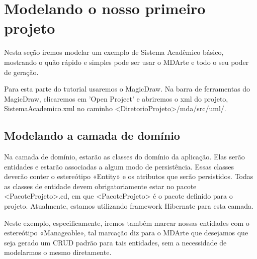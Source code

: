 \section{Modelando o nosso primeiro projeto}

Nesta seção iremos modelar um exemplo de Sistema Acadêmico básico, mostrando o
quão rápido e simples pode ser usar o MDArte e todo o seu poder de geração.

Para esta parte do tutorial usaremos o MagicDraw. Na barra de ferramentas do
MagicDraw, clicaremos em 'Open Project' e abriremos o xml do projeto,
SistemaAcademico.xml no caminho
<DiretorioProjeto>/mda/src/uml/.

\subsection{Modelando a camada de domínio}
Na camada de domínio, estarão as classes do domínio da aplicação. Elas serão entidades e
estarão associadas a algum modo de persistência. Essas classes deverão conter o estereótipo
«Entity» e os atributos que serão persistidos. Todas as classes de entidade devem obrigatoriamente
estar no pacote <PacoteProjeto>.cd, em que <PacoteProjeto> é o pacote definido para o projeto.
Atualmente, estamos utilizando framework Hibernate para esta camada. 

Neste exemplo, especificamente, iremos também marcar nossas entidades com o
estereótipo «Manageable», tal marcação diz para o MDArte que desejamos que seja
gerado um CRUD padrão para tais entidades, sem a necessidade de modelarmos o
mesmo diretamente.

